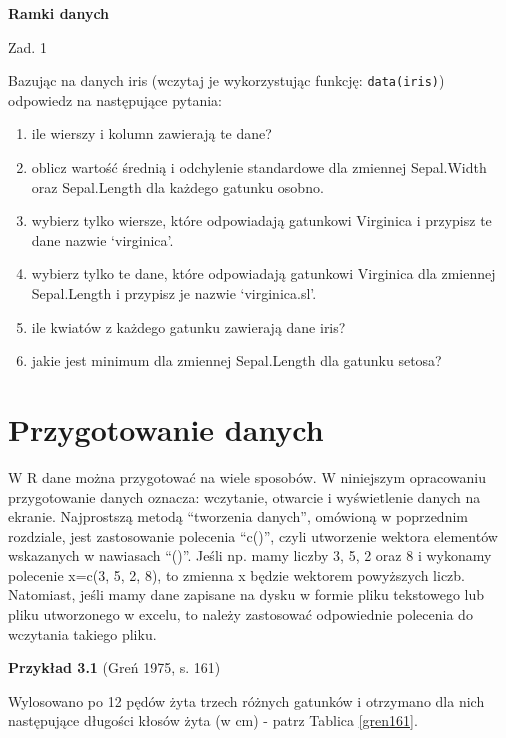 \documentclass[12pt,B5paper,]{book}
\begin{document}
\vspace{0.8cm}

\textbf{Ramki danych}

Zad. 1

Bazując na danych iris (wczytaj je wykorzystując funkcję:
\texttt{data(iris)}) odpowiedz na następujące pytania:

\begin{enumerate}
\def\labelenumi{\alph{enumi})}
\item
  ile wierszy i kolumn zawierają te dane?
\item
  oblicz wartość średnią i odchylenie standardowe dla zmiennej
  Sepal.Width oraz Sepal.Length dla każdego gatunku osobno.
\item
  wybierz tylko wiersze, które odpowiadają gatunkowi Virginica i
  przypisz te dane nazwie `virginica'.
\item
  wybierz tylko te dane, które odpowiadają gatunkowi Virginica dla
  zmiennej Sepal.Length i przypisz je nazwie `virginica.sl'.
\item
  ile kwiatów z każdego gatunku zawierają dane iris?
\item
  jakie jest minimum dla zmiennej Sepal.Length dla gatunku setosa?
\end{enumerate}

\chapter{Przygotowanie danych}\label{przygotowanie-danych}

W R dane można przygotować na wiele sposobów. W niniejszym opracowaniu
przygotowanie danych oznacza: wczytanie, otwarcie i wyświetlenie danych
na ekranie. Najprostszą metodą ``tworzenia danych'', omówioną w
poprzednim rozdziale, jest zastosowanie polecenia ``c()'', czyli
utworzenie wektora elementów wskazanych w nawiasach ``()''. Jeśli np.
mamy liczby 3, 5, 2 oraz 8 i wykonamy polecenie x=c(3, 5, 2, 8), to
zmienna x będzie wektorem powyższych liczb. Natomiast, jeśli mamy dane
zapisane na dysku w formie pliku tekstowego lub pliku utworzonego w
excelu, to należy zastosować odpowiednie polecenia do wczytania takiego
pliku.

\vspace{0.8cm} \textbf{Przykład 3.1} (Greń 1975, s. 161)

Wylosowano po 12 pędów żyta trzech różnych gatunków i otrzymano dla nich
następujące długości kłosów żyta (w cm) - patrz Tablica \ref{gren161}.
\end{document}
